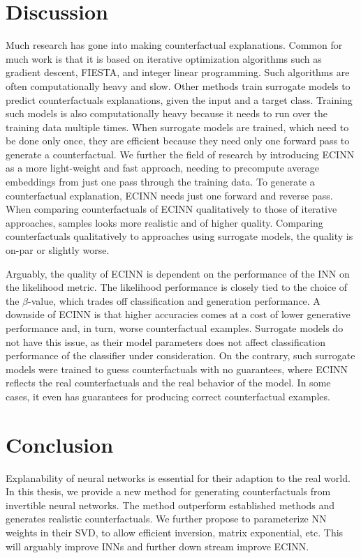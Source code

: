 \documentclass[11pt,a4paper,twoside,openright,final]{memoir}
\begin{document}
\section{Discussion}
Much research has gone into making counterfactual explanations. 
Common for much work is that it is based on iterative optimization algorithms such as gradient descent, FIESTA, and integer linear programming.
Such algorithms are often computationally heavy and slow.
Other methods train surrogate models to predict counterfactuals explanations, given the input and a target class.
Training such models is also computationally heavy because it needs to run over the training data multiple times.
When surrogate models are trained, which need to be done only once, they are efficient because they need only one forward pass to generate a counterfactual.
We further the field of research by introducing ECINN as a more light-weight and fast approach, needing to precompute average embeddings from just one pass through the training data.
To generate a counterfactual explanation, ECINN needs just one forward and reverse pass. 
When comparing counterfactuals of ECINN qualitatively to those of iterative approaches, samples looks more realistic and of higher quality.
Comparing counterfactuals qualitatively to approaches using surrogate models, the quality is on-par or slightly worse.

Arguably, the quality of ECINN is dependent on the performance of the INN on the likelihood metric.
The likelihood performance is closely tied to the choice of the $\beta$-value, which trades off classification and generation performance.
A downside of ECINN is that higher accuracies comes at a cost of lower generative performance and, in turn, worse counterfactual examples.
Surrogate models do not have this issue, as their model parameters does not affect classification performance of the classifier under consideration.
On the contrary, such surrogate models were trained to guess counterfactuals with no guarantees, where ECINN reflects the real counterfactuals and the real behavior of the model.
In some cases, it even has guarantees for producing correct counterfactual examples.

\section{Conclusion}
Explanability of neural networks is essential for their adaption to the real world.
In this thesis, we provide a new method for generating counterfactuals from invertible neural networks. 
The method outperform established methods and generates realistic counterfactuals.
We further propose to parameterize NN weights in their SVD, to allow efficient inversion, matrix exponential, etc.
This will arguably improve INNs and further down stream improve ECINN.
\end{document}
